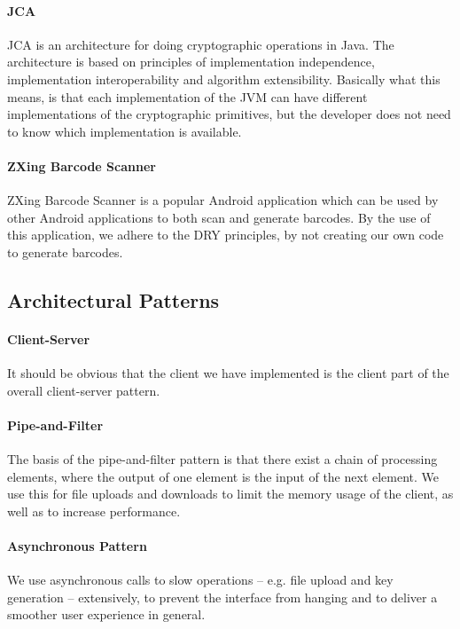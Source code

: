 \documentclass[pdftex,english,10pt,b5paper,twoside]{book}
\begin{document}
\paragraph{\ac{JCA}} \ac{JCA} is an architecture for doing cryptographic
operations in Java. The architecture is based on principles of implementation
independence, implementation interoperability and algorithm extensibility.
Basically what this means, is that each implementation of the \ac{JVM} can have
different implementations of the cryptographic primitives, but the developer
does not need to know which implementation is available.

\paragraph{ZXing Barcode Scanner} ZXing Barcode Scanner is a popular Android
application which can be used by other Android applications to both scan and
generate barcodes. By the use of this application, we adhere to the \ac{DRY}
principles, by not creating our own code to generate barcodes.

\subsection{Architectural Patterns}

\paragraph{Client-Server} It should be obvious that the client we have
implemented is the client part of the overall client-server pattern.

\paragraph{Pipe-and-Filter} The basis of the pipe-and-filter pattern is that
there exist a chain of processing elements, where the output of one element is
the input of the next element. We use this for file uploads and downloads to
limit the memory usage of the client, as well as to increase performance.

\paragraph{Asynchronous Pattern} We use asynchronous calls to slow operations
-- e.g. file upload and key generation -- extensively, to prevent the interface
from hanging and to deliver a smoother user experience in general.
\end{document}
